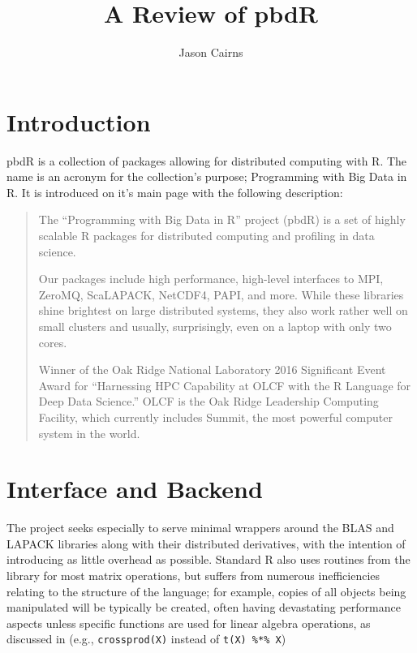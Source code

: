 \documentclass[a4paper]{article}
\begin{document}
\title{A Review of pbdR}
\author{Jason Cairns}
  
\maketitle

\section{Introduction}
\label{sec:pbdr}

pbdR is a collection of packages allowing for distributed computing with
R\cite{pbdBASEpackage}. The name is an acronym for the collection's purpose;
Programming with Big Data in R. It is introduced on it's main page with the
following description:
\begin{quote}
	The ``Programming with Big Data in R'' project (pbdR) is a set of highly scalable
	R packages for distributed computing and profiling in data science.

	Our packages include high performance, high-level interfaces to MPI, ZeroMQ,
	ScaLAPACK, NetCDF4, PAPI, and more. While these libraries shine brightest on
	large distributed systems, they also work rather well on small clusters and
	usually, surprisingly, even on a laptop with only two cores.

	Winner of the Oak Ridge National Laboratory 2016 Significant Event Award for
	``Harnessing HPC Capability at OLCF with the R Language for Deep Data Science.''
	OLCF is the Oak Ridge Leadership Computing Facility, which currently includes
	Summit, the most powerful computer system in the world.\cite{pbdR2012}
\end{quote}

\section{Interface and Backend}

The project seeks especially to serve minimal wrappers around the BLAS and LAPACK
libraries along with their distributed derivatives, with the intention of
introducing as little overhead as possible.  Standard R also uses routines from
the library for most matrix operations, but suffers from numerous
inefficiencies relating to the structure of the language; for example, copies
of all objects being manipulated will be typically be created, often having
devastating performance aspects unless specific functions are used for linear
algebra operations, as discussed in \citeauthor{schmidt2017programming} (e.g.,
\texttt{crossprod(X)} instead of \texttt{t(X) \%*\% X})
\end{document}
